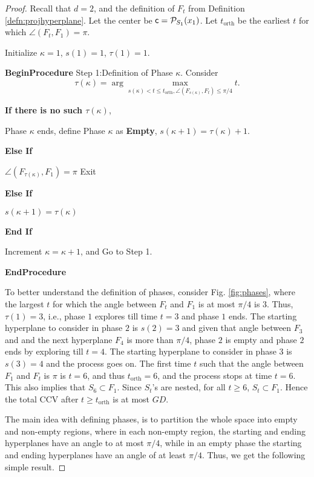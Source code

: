 \begin{proof}
Recall that $d=2$, and the definition of $F_t$ from Definition \ref{defn:projhyperplane}. Let the center be ${\mathsf{c}}=\mathcal{P}_{S_1}(x_1)$.  Let $t_{\text{orth}}$ be the earliest $t$ for which $\angle (F_t, F_1) = \pi$.

Initialize $\kappa=1$, $s(1)=1$, $\tau(1) =1$. 



{\bf BeginProcedure}
Step 1:Definition of Phase $\kappa$.
Consider $$\tau(\kappa) = \arg \max_{s(\kappa)< t \le t_{\text{orth}}, \angle(F_{s(\kappa)}, F_t) \le \pi/4} t.$$

{\bf If there is no such $\tau(\kappa)$}, 

\quad Phase $\kappa$ ends, define Phase $\kappa$ as {\bf Empty},  $s(\kappa+1) =  \tau(\kappa)+1$.


{\bf Else If} 

\quad $\angle(F_{\tau(\kappa)}, F_1)=\pi$ Exit

{\bf Else If} 

\quad $s(\kappa+1)=\tau(\kappa)$

{\bf End If}

Increment $\kappa=\kappa+1$,  and Go to Step 1.

{\bf EndProcedure}

\begin{example}\label{exm:phasedef} To better understand the definition of phases, consider Fig. \ref{fig:phases}, where the largest $t$ for which the angle between $F_t$ and $F_1$ is at most $\pi/4$ is $3$. Thus, $\tau(1)=3$, i.e., phase $1$ explores till time $t=3$ and phase $1$ ends. The starting hyperplane to consider in phase $2$ is $s(2)=3$ 
and given that angle between $F_3$ and and the next hyperplane $F_4$ is more than $\pi/4$, phase $2$ is empty and phase $2$ ends by exploring till $t=4$. The starting hyperplane to consider in phase $3$ is $s(3)=4$ and the process goes on. The first time $t$ such that the angle between $F_1$ and $F_t$ is $\pi$ is $t=6$, and thus $t_{\text{orth}}=6$, and the process stops at time $t=6$. 
This also implies that $S_6 \subset F_1$. 
Since $S_t$'s are nested, for all $t\ge 6$, $S_t\subset F_1$. Hence the total CCV after $t\ge t_{\text{orth}}$ is at most $GD$.
\end{example}

The main idea with defining phases, is to partition the whole space into empty and non-empty regions, where in each non-empty region, the starting and ending hyperplanes have an angle to at most $\pi/4$, while in an empty phase the starting and ending hyperplanes have an angle of at least $\pi/4$. Thus, we get the following simple result.


\end{proof}

